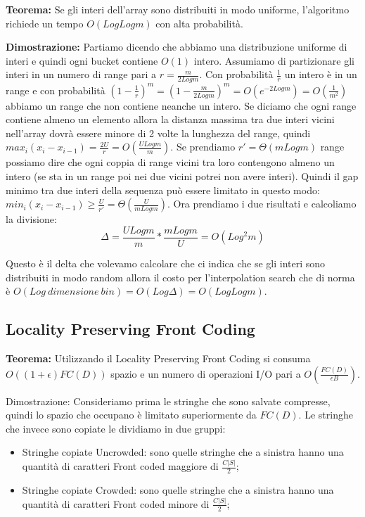 \documentclass[12pt]{article}
\begin{document}
\textbf{Teorema:} Se gli interi dell'array sono distribuiti in modo uniforme, l'algoritmo richiede un tempo $O(Log Log m)$ con alta probabilità.

\textbf{Dimostrazione:} Partiamo dicendo che abbiamo una distribuzione uniforme di interi e quindi ogni bucket contiene $O(1)$ intero. 
Assumiamo di partizionare gli interi in un numero di range pari a $r=\frac{m}{2Logm}$. Con probabilità $\frac{1}{r}$ un intero è in un range e con probabilità $(1-\frac{1}{r})^m = (1-\frac{m}{2Logm})^m = O(e^{-2Logm}) = O(\frac{1}{m^2})$ abbiamo un range che non contiene neanche un intero.
Se diciamo che ogni range contiene almeno un elemento allora la distanza massima tra due interi vicini nell'array dovrà essere minore di 2 volte la lunghezza del range, quindi $max_i(x_i-x_{i-1})=\frac{2U}{r}=O(\frac{ULogm}{m})$.
Se prendiamo $r' = \Theta(mLogm)$ range possiamo dire che ogni coppia di range vicini tra loro contengono almeno un intero (se sta in un range poi nei due vicini potrei non avere interi).
Quindi il gap minimo tra due interi della sequenza può essere limitato in questo modo: $min_i(x_i-x_{i-1})\geq \frac{U}{r'} = \Theta(\frac{U}{mLogm})$.
Ora prendiamo i due risultati e calcoliamo la divisione:
\begin{equation}
    \Delta = \frac{ULogm}{m}*\frac{mLogm}{U} = O(Log^2 m)
\end{equation}

Questo è il delta che volevamo calcolare che ci indica che se gli interi sono distribuiti in modo random allora il costo per l'interpolation search che di norma è $O(Log \ dimensione\ bin) = O(Log \Delta) = O(Log Log m)$.


\subsection{Locality Preserving Front Coding}


\textbf{Teorema:} Utilizzando il Locality Preserving Front Coding si consuma $O((1+\epsilon)FC(D))$ spazio e un numero di operazioni I/O pari a $O(\frac{FC(D)}{\epsilon B})$.

Dimostrazione: Consideriamo prima le stringhe che sono salvate compresse, quindi lo spazio che occupano è limitato superiormente da $FC(D)$. Le stringhe che invece sono copiate le dividiamo in due gruppi:
\begin{itemize}
\item Stringhe copiate Uncrowded: sono quelle stringhe che a sinistra hanno una quantità di caratteri Front coded maggiore di $\frac{C|S|}{2}$;
\item Stringhe copiate Crowded: sono quelle stringhe che a sinistra hanno una quantità di caratteri Front coded minore di $\frac{C|S|}{2}$;
\end{itemize}
\end{document}
